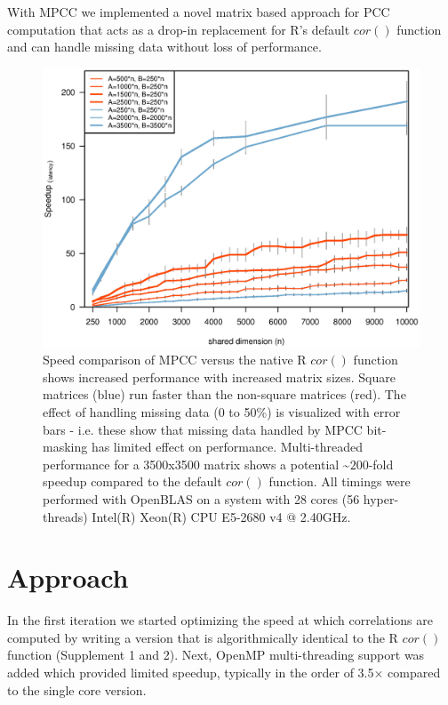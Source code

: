 \documentclass{bioinfo}
\begin{document}
With MPCC we implemented a novel matrix based approach for PCC
computation that acts as a drop-in replacement for R's default $cor()$
function and can handle missing data without loss of performance.
\vspace*{-4mm}

\begin{figure}[H]
\centering
\includegraphics[width=\linewidth]{img/figure02big.eps}
  \vspace{-8mm} \caption{ \small Speed comparison of MPCC versus the
  native R $cor()$ function shows increased performance with increased
  matrix sizes. Square matrices (blue) run faster than the non-square
  matrices (red).  The effect of handling missing data (0 to 50\%) is
  visualized with error bars - i.e. these show that missing data
  handled by MPCC bit-masking has limited effect on performance.
  Multi-threaded performance for a 3500x3500 matrix shows a
  potential \textasciitilde{}$200$-fold speedup compared to the
  default $cor()$ function.  All timings were performed with OpenBLAS
  on a system with 28 cores (56 hyper-threads) Intel(R) Xeon(R) CPU
  E5-2680 v4 @ 2.40GHz.  } \label{fig:fig1}
\end{figure}

\vspace*{-12mm}

\section{Approach}

In the first iteration we started optimizing the speed at which
correlations are computed by writing a version that is algorithmically
identical to the R $cor()$ function (Supplement 1 and 2). Next, OpenMP
multi-threading support was added which provided limited speedup,
typically in the order of 3.5$\times$ compared to the single core
version.
\end{document}
